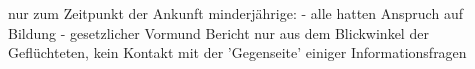 nur zum Zeitpunkt der Ankunft minderjährige:
    - alle hatten Anspruch auf Bildung
    - gesetzlicher Vormund
Bericht nur aus dem Blickwinkel der Geflüchteten, kein Kontakt mit der 'Gegenseite' einiger Informationsfragen